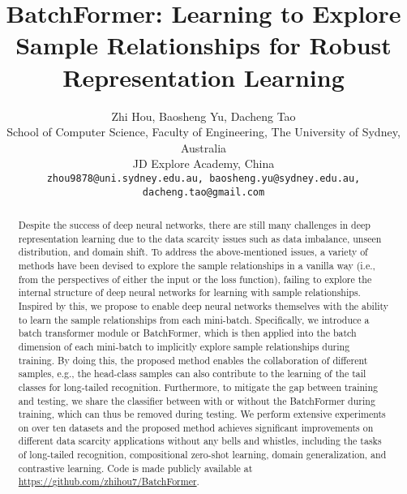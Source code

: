 \documentclass[10pt,twocolumn,letterpaper]{article}
\begin{document}
\title{BatchFormer: Learning to Explore Sample Relationships for Robust Representation Learning}
\author{Zhi Hou, Baosheng Yu, Dacheng Tao \\
 School of Computer Science, Faculty of Engineering, The University of Sydney, Australia \\
 JD Explore Academy, China \\
{\tt\small zhou9878@uni.sydney.edu.au, baosheng.yu@sydney.edu.au, dacheng.tao@gmail.com}
}
\maketitle
















\begin{abstract}
Despite the success of deep neural networks, there are still many challenges in deep representation learning due to the data scarcity issues such as data imbalance, unseen distribution, and domain shift. To address the above-mentioned issues, a variety of methods have been devised to explore the sample relationships in a vanilla way (i.e., from the perspectives of either the input or the loss function), failing to explore the internal structure of deep neural networks for learning with sample relationships. Inspired by this, we propose to enable deep neural networks themselves with the ability to learn the sample relationships from each mini-batch. Specifically, we introduce a batch transformer module or BatchFormer, which is then applied into the batch dimension of each mini-batch to implicitly explore sample relationships during training. By doing this, the proposed method enables the collaboration of different samples, e.g., the head-class samples can also contribute to the learning of the tail classes for long-tailed recognition. Furthermore, to mitigate the gap between training and testing, we
share the classifier between with or without the BatchFormer during training, which can thus be removed during testing. We perform extensive experiments on over ten datasets and the proposed method achieves significant improvements on different data scarcity applications without any bells and whistles, including the tasks of long-tailed recognition, compositional zero-shot learning, domain generalization, and contrastive learning. Code is made publicly available at \url{https://github.com/zhihou7/BatchFormer}.
\end{abstract}
\end{document}
